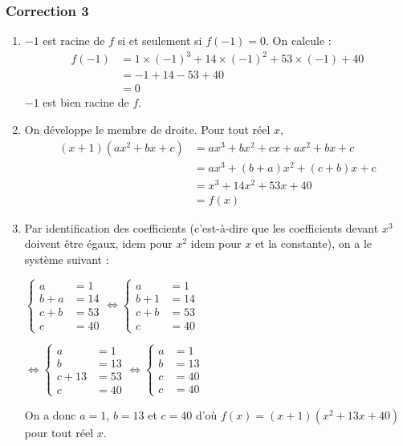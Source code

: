 \documentclass[15pt, mathserif]{beamer}
\begin{document}
\begin{frame}
\vspace{-10mm}
	\frametitle{Correction 3}
\bigskip 
 \begin{enumerate} 
 	 \item $-1$ est racine de $f$ si et seulement si $f(-1)=0$. On calcule : 
 	 	 \begin{align*}f(-1)&= 1 \times \left(-1\right)^3 +14 \times \left(-1\right)^2+53\times \left(-1\right)+40 \\ 
 &= -1+14-53+40 \\ 
 &= 0 
 	  \end{align*} 
  $-1$ est bien racine de $f$. 
 	 \item On développe le membre de droite. Pour tout réel $x$, 
 	 \begin{align*} (x+1)(ax^2+bx+c) 
 &= ax^3+bx^2+cx+ax^2+bx+c \\ 
   &= ax^3 +(b+a)x^2+(c+b)x+c \\ 
 &= x^3+14x^2+53x+40\\ 
 &= f(x)
 \end{align*} 
 
 \end{enumerate}
 \end{frame} 
 \begin{frame} 
 \begin{enumerate} 
 \setcounter{enumi}{2} 
 	 \item Par identification des coefficients (c'est-à-dire que les coefficients devant $x^3$ doivent être égaux, idem pour $x^2$ idem pour $x$ et la constante), on a le système suivant : 
 
 \hfil $\begin{cases} 
 a &=1 \\ 
  b+a &=14 \\ 
  c+b &= 53 \\ 
  c &= 40 
 \end{cases} 
 \Longleftrightarrow 
 \begin{cases} a &=1 \\ 
 b+1&=14 \\ 
  c+b &= 53 \\ 
  c &= 40 
 \end{cases} $ 
 
 \hfil $ \Longleftrightarrow 
 \begin{cases} a &=1 \\ 
 b &=13 \\ 
  c+13 &= 53 \\ 
  c &= 40 
 \end{cases} 
  \Longleftrightarrow 
 \begin{cases}  a &=1 \\ 
 b &=13 \\ 
  c &= 40 \\ 
  c &= 40 
 \end{cases}$ 
 
 On a donc $a=1$, $b=13$ et $c=40$ d'où $f(x)=(x+1)(x^2+13x+40)$ pour tout réel $x$. 
 \end{enumerate}
 \end{frame} 
\end{document}

